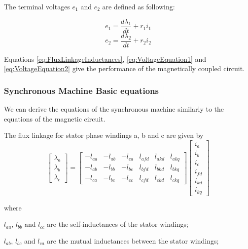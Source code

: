 The terminal voltages $e_1$ and $e_2$ are defined as following:

\begin{equation} \label{eq:VoltageEquation1}
	e_1 = \frac{d \lambda_1}{d t} + r_1 i_1
\end{equation}
\begin{equation} \label{eq:VoltageEquation2}
	e_2 = \frac{d \lambda_2}{d t} + r_2 i_2
\end{equation}

Equations \ref{eq:FluxLinkageInductances}, \ref{eq:VoltageEquation1} and \ref{eq:VoltageEquation2} give the performance of the magnetically coupled circuit.

\subsubsection{Synchronous Machine Basic equations}

We can derive the equations of the synchronous machine similarly to the equations of the magnetic circuit.

The flux linkage for stator phase windings a, b and c are given by
\begin{equation} \label{eq:FluxStator}
	\begin{bmatrix}
		\lambda_a \\
		\lambda_b \\
		\lambda_c
	\end{bmatrix}
	=
	\begin{bmatrix}
		-l_{aa} & -l_{ab} & -l_{ca} & l_{afd} & l_{akd} & l_{akq} \\  
		-l_{ab} & -l_{bb} & -l_{bc} & l_{bfd} & l_{bkd} & l_{bkq} \\  
		-l_{ca} & -l_{bc} & -l_{cc} & l_{cfd} & l_{ckd} & l_{ckq}  
	\end{bmatrix}
	\begin{bmatrix}
		i_a \\
		i_b \\
		i_c \\
		i_{fd} \\
		i_{kd} \\
		i_{kq}
	\end{bmatrix}
\end{equation}

where

$l_{aa}$, $l_{bb}$ and $l_{cc}$ are the self-inductances of the stator windings;

$l_{ab}$, $l_{bc}$ and $l_{ca}$ are the mutual inductances between the stator windings;

